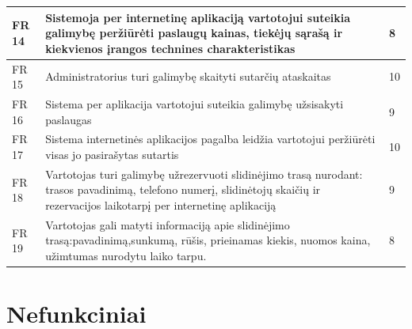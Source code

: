 \documentclass[oneside]{VUMIFPSkursinis}
\begin{document}
\begin{longtable}{ | p{}|p{}|p{}| }
	FR 14 & Sistemoja per internetinę aplikaciją vartotojui suteikia galimybę peržiūrėti paslaugų kainas, tiekėjų sąrašą ir kiekvienos įrangos technines charakteristikas & 8 \\ \hline
	FR 15 & Administratorius turi galimybę skaityti sutarčių ataskaitas & 10\\ \hline
	FR 16 & Sistema per aplikacija vartotojui suteikia galimybę užsisakyti paslaugas &  9\\ \hline
	FR 17 & Sistema internetinės aplikacijos pagalba leidžia vartotojui peržiūrėti visas jo pasirašytas sutartis & 10 \\ \hline
	FR 18 &  Vartotojas turi galimybę užrezervuoti slidinėjimo trasą nurodant: trasos pavadinimą, telefono numerį, slidinėtojų skaičių ir rezervacijos laikotarpį per internetinę aplikaciją & 9 \\ \hline
	FR 19 &  Vartotojas gali matyti informaciją apie slidinėjimo trasą:pavadinimą,sunkumą, rūšis, prieinamas kiekis, nuomos kaina, užimtumas nurodytu laiko tarpu. & 8 \\ \hline
	\end{longtable}

 
\section{Nefunkciniai}
\end{document}
